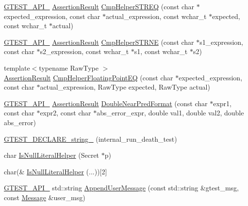 \begin{DoxyCompactItemize}
\item 
\hyperlink{gtest-port_8h_aa73be6f0ba4a7456180a94904ce17790}{G\+T\+E\+S\+T\+\_\+\+A\+P\+I\+\_\+} \hyperlink{classtesting_1_1_assertion_result}{Assertion\+Result} \hyperlink{namespacetesting_1_1internal_a5a60e3eb4490e67f00fdb62dd147cd89}{Cmp\+Helper\+S\+T\+R\+E\+Q} (const char $\ast$expected\+\_\+expression, const char $\ast$actual\+\_\+expression, const wchar\+\_\+t $\ast$expected, const wchar\+\_\+t $\ast$actual)
\item 
\hyperlink{gtest-port_8h_aa73be6f0ba4a7456180a94904ce17790}{G\+T\+E\+S\+T\+\_\+\+A\+P\+I\+\_\+} \hyperlink{classtesting_1_1_assertion_result}{Assertion\+Result} \hyperlink{namespacetesting_1_1internal_a415a953647bbc9469f062dc966061efb}{Cmp\+Helper\+S\+T\+R\+N\+E} (const char $\ast$s1\+\_\+expression, const char $\ast$s2\+\_\+expression, const wchar\+\_\+t $\ast$s1, const wchar\+\_\+t $\ast$s2)
\item 
{\footnotesize template$<$typename Raw\+Type $>$ }\\\hyperlink{classtesting_1_1_assertion_result}{Assertion\+Result} \hyperlink{namespacetesting_1_1internal_aaf581f35dfe9f1a3705f99b455a18abd}{Cmp\+Helper\+Floating\+Point\+E\+Q} (const char $\ast$expected\+\_\+expression, const char $\ast$actual\+\_\+expression, Raw\+Type expected, Raw\+Type actual)
\item 
\hyperlink{gtest-port_8h_aa73be6f0ba4a7456180a94904ce17790}{G\+T\+E\+S\+T\+\_\+\+A\+P\+I\+\_\+} \hyperlink{classtesting_1_1_assertion_result}{Assertion\+Result} \hyperlink{namespacetesting_1_1internal_a4f70b36c624b54c2362aeecc2f05ee8c}{Double\+Near\+Pred\+Format} (const char $\ast$expr1, const char $\ast$expr2, const char $\ast$abs\+\_\+error\+\_\+expr, double val1, double val2, double abs\+\_\+error)
\item 
\hyperlink{namespacetesting_1_1internal_ac20f635c3285878fc1195ce687f23950}{G\+T\+E\+S\+T\+\_\+\+D\+E\+C\+L\+A\+R\+E\+\_\+string\+\_\+} (internal\+\_\+run\+\_\+death\+\_\+test)
\item 
char \hyperlink{namespacetesting_1_1internal_afb0731ba39ffef1fa1730ac0699c9025}{Is\+Null\+Literal\+Helper} (Secret $\ast$p)
\item 
char(\& \hyperlink{namespacetesting_1_1internal_ab53ecfa1632a871ce7c692d722a75a57}{Is\+Null\+Literal\+Helper} (...))\mbox{[}2\mbox{]}
\item 
\hyperlink{gtest-port_8h_aa73be6f0ba4a7456180a94904ce17790}{G\+T\+E\+S\+T\+\_\+\+A\+P\+I\+\_\+} std\+::string \hyperlink{namespacetesting_1_1internal_ae475a090bca903bb222dd389eb189166}{Append\+User\+Message} (const std\+::string \&gtest\+\_\+msg, const \hyperlink{classtesting_1_1_message}{Message} \&user\+\_\+msg)

\end{DoxyCompactItemize}
